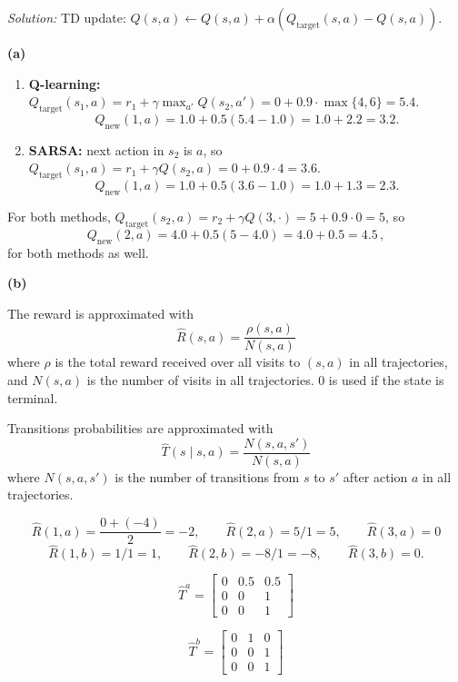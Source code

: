 \documentclass{article}
\theoremstyle{definition}
\newenvironment{solution}{\noindent\textit{Solution:}}{}
\begin{document}
\begin{solution}
TD update: $Q(s,a)\leftarrow Q(s,a)+\alpha\left(Q_\text{target}(s,a)-Q(s,a)\right)$.

\textbf{(a)}

\begin{enumerate}[label=\roman*)]
\item \textbf{Q-learning:} $Q_\text{target}(s_1, a)=r_1+\gamma\max_{a'}Q(s_2,a')=0+0.9\cdot \max\{4,6\}=5.4$.
\[
Q_{\text{new}}(1,a)=1.0+0.5(5.4-1.0)=1.0+2.2=3.2.
\]

\item \textbf{SARSA:} next action in $s_2$ is $a$, so $Q_\text{target}(s_1, a)=r_1+\gamma Q(s_2,a)=0+0.9\cdot 4=3.6$.
\[
Q_{\text{new}}(1,a)=1.0+0.5(3.6-1.0)=1.0+1.3=2.3.
\]
\end{enumerate}

For both methods, $Q_\text{target}(s_2,a) =r_2+\gamma Q(3,\cdot)=5+0.9\cdot 0=5$, so
\[
Q_{\text{new}}(2,a)=4.0+0.5(5-4.0)=4.0+0.5=4.5\, ,
\]
for both methods as well.

\textbf{(b)}

The reward is approximated with
\[
    \hat{R}(s, a) = \frac{\rho(s,a)}{N(s,a)}
\]
where $\rho$ is the total reward received over all visits to $(s, a)$ in all trajectories, and $N(s, a)$ is the number of visits in all trajectories. 0 is used if the state is terminal.

Transitions probabilities are approximated with
\[
    \hat{T}(s \mid s, a) = \frac{N(s, a, s')}{N(s, a)}
\]
where $N(s, a, s')$ is the number of transitions from $s$ to $s'$ after action $a$ in all trajectories.

\[
    \hat R(1,a)=\frac{0+(-4)}{2}=-2,\qquad
    \hat R(2,a)=5/1=5,\qquad
    \hat R(3,a)=0
\]
\[
    \hat R(1,b)=1/1=1,\qquad
    \hat R(2,b)=-8/1=-8,\qquad
    \hat R(3,b)=0.
\]

\[
    \hat{T}^a = \begin{bmatrix}
        0 & 0.5 & 0.5 \\
        0 & 0 & 1 \\
        0 & 0 & 1
    \end{bmatrix}
\]

\[
    \hat{T}^b = \begin{bmatrix}
        0 & 1 & 0 \\
        0 & 0 & 1 \\
        0 & 0 & 1
    \end{bmatrix}
\]

\end{solution}
\end{document}
